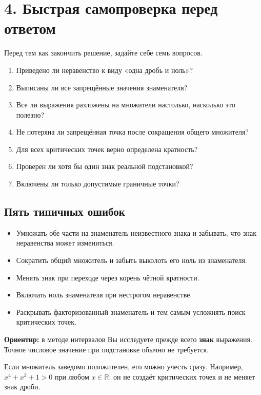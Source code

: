 \documentclass[a4paper,12pt]{article}
\newcommand{\important}[1]{\textcolor{darkaccent}{\textbf{#1}}}
\newcommand{\R}{\mathbb{R}}
\begin{document}
\section*{4. Быстрая самопроверка перед ответом}
Перед тем как закончить решение, задайте себе семь вопросов.
\begin{enumerate}
  \item Приведено ли неравенство к виду «одна дробь и ноль»?
  \item Выписаны ли все запрещённые значения знаменателя?
  \item Все ли выражения разложены на множители настолько, насколько это полезно?
  \item Не потеряна ли запрещённая точка после сокращения общего множителя?
  \item Для всех критических точек верно определена кратность?
  \item Проверен ли хотя бы один знак реальной подстановкой?
  \item Включены ли только допустимые граничные точки?
\end{enumerate}

\subsection*{Пять типичных ошибок}
\begin{itemize}
  \item Умножать обе части на знаменатель неизвестного знака и забывать, что знак неравенства может измениться.
  \item Сократить общий множитель и забыть выколоть его ноль из знаменателя.
  \item Менять знак при переходе через корень чётной кратности.
  \item Включать ноль знаменателя при нестрогом неравенстве.
  \item Раскрывать факторизованный знаменатель и тем самым усложнять поиск критических точек.
\end{itemize}

\important{Ориентир:} в методе интервалов Вы исследуете прежде всего \textbf{знак} выражения. Точное числовое значение при подстановке обычно не требуется.

Если множитель заведомо положителен, его можно учесть сразу. Например, \(x^4+x^2+1>0\) при любом \(x\in\R\): он не создаёт критических точек и не меняет знак дроби.

\clearpage

\end{document}

